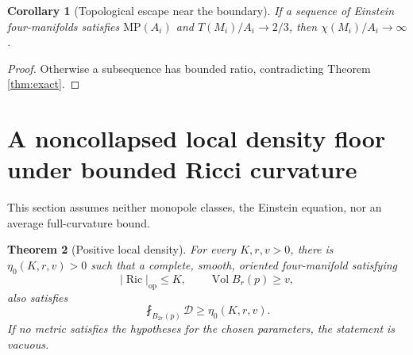 \documentclass[a4paper,11pt]{article}
\theoremstyle{paper}
\newtheorem{theorem}{Theorem}[section]
\newtheorem{corollary}[theorem]{Corollary}
\DeclareMathOperator{\Ric}{Ric}
\DeclareMathOperator{\Vol}{Vol}
\newcommand{\op}{\mathrm{op}}
\newcommand{\av}{\fint}
\newcommand{\Dcal}{\mathcal D}
\numberwithin{equation}{section}
\begin{document}
\begin{corollary}[Topological escape near the boundary]
If a sequence of Einstein four-manifolds satisfies $\mathrm{MP}(A_i)$ and
$T(M_i)/A_i\to2/3$, then $\chi(M_i)/A_i\to\infty$.
\end{corollary}
\begin{proof}
Otherwise a subsequence has bounded ratio, contradicting Theorem \ref{thm:exact}.
\end{proof}

\section{A noncollapsed local density floor under bounded Ricci curvature}

This section assumes neither monopole classes, the Einstein equation, nor an average full-curvature bound.

\begin{theorem}[Positive local density]\label{thm:local}
For every $K,r,v>0$, there is $\eta_0(K,r,v)>0$ such that a complete, smooth, oriented four-manifold satisfying
\[
|\Ric|_{\op}\le K,\qquad \Vol B_r(p)\ge v,
\]
also satisfies
\begin{equation}\label{eq:local-floor}
\av_{B_{2r}(p)}\Dcal\ge\eta_0(K,r,v).
\end{equation}
If no metric satisfies the hypotheses for the chosen parameters, the statement is vacuous.
\end{theorem}
\end{document}
